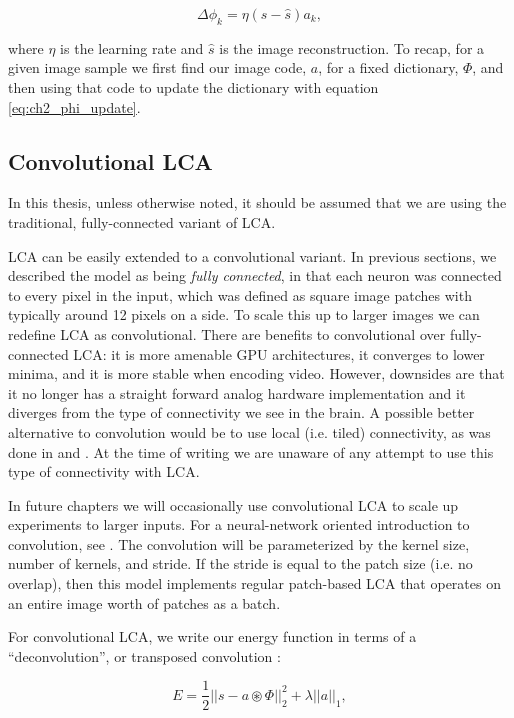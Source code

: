 \begin{equation}\label{eq:ch2_phi_update}
    \Delta \phi_{k} = \eta (s - \hat{s}) a_{k},
\end{equation}

\noindent where $\eta$ is the learning rate and $\hat{s}$ is the image reconstruction. To recap, for a given image sample we first find our image code, $a$, for a fixed dictionary, $\Phi$, and then using that code to update the dictionary with equation \eqref{eq:ch2_phi_update}.


\subsection{Convolutional LCA}
In this thesis, unless otherwise noted, it should be assumed that we are using the traditional, fully-connected variant of LCA.

LCA can be easily extended to a convolutional variant. In previous sections, we described the model as being \textit{fully connected}, in that each neuron was connected to every pixel in the input, which was defined as square image patches with typically around 12 pixels on a side. To scale this up to larger images we can redefine LCA as convolutional. There are benefits to convolutional over fully-connected LCA: it is more amenable GPU architectures, it converges to lower minima, and it is more stable when encoding video. However, downsides are that it no longer has a straight forward analog hardware implementation and it diverges from the type of connectivity we see in the brain. A possible better alternative to convolution would be to use local (i.e. tiled) connectivity, as was done in \parencite{le2011building} and \parencite{ngiam2010tiled}. At the time of writing we are unaware of any attempt to use this type of connectivity with LCA.

In future chapters we will occasionally use convolutional LCA to scale up experiments to larger inputs. For a neural-network oriented introduction to convolution, see \parencite{goodfellow2016deep}. The convolution will be parameterized by the kernel size, number of kernels, and stride. If the stride is equal to the patch size (i.e. no overlap), then this model implements regular patch-based LCA that operates on an entire image worth of patches as a batch.

For convolutional LCA, we write our energy function in terms of a ``deconvolution'', or transposed convolution \parencite{zeiler2010deconvolutional}:

\begin{equation}
    E = \frac{1}{2} || s - a \circledast \Phi ||^{2}_{2} + \lambda ||a||_{1},
\end{equation}

